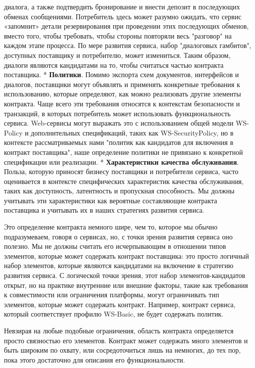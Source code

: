 \documentclass[11pt]{article}
\begin{document}
диалога, а также подтвердить бронирование и внести депозит в последующих
обменах сообщениями. Потребитель здесь может разумно ожидать, что сервис
«запомнит» детали резервирования при проведении этих последующих
обменов, вместо того, чтобы требовать, чтобы стороны повторяли весь
"разговор" на каждом этапе процесса. По мере развития сервиса, набор
"диалоговых гамбитов", доступных поставщику и потребителю, может
измениться. Таким образом, диалоги являются кандидатами на то, чтобы
считаться частью контракта поставщика. * \textbf{Политики}. Помимо
экспорта схем документов, интерфейсов и диалогов, поставщики могут
объявлять и применять конкретные требования к использованию, которые
определяют, как можно реализовать другие элементы контракта. Чаще всего
эти требования относятся к контекстам безопасности и транзакций, в
которых потребитель может использовать функциональность сервиса.
Web-сервисы могут выражать это с использованием общей модели WS-Policy и
дополнительных спецификаций, таких как WS-SecurityPolicy, но в контексте
рассматриваемых нами "политик как кандидатов для включения в контракт
поставщика", наше определение политики не привязано к конкретной
спецификации или реализации. * \textbf{Характеристики качества
обслуживания}. Польза, которую приносят бизнесу поставщики и потребители
сервиса, часто оценивается в контексте специфических характеристик
качества обслуживания, таких как доступность, латентность и пропускная
способность. Мы должны учитывать эти характеристики как вероятные
составляющие контракта поставщика и учитывать их в наших стратегиях
развития сервиса.

Это определение контракта немного шире, чем то, которое мы обычно
подразумеваем, говоря о сервисах, но, с точки зрения развития сервиса
оно полезно. Мы не должны считать его исчерпывающим в отношении типов
элементов, которые может содержать контракт поставщика: это просто
логичный набор элементов, которые являются кандидатами на включение в
стратегию развития сервиса. С логической точки зрения, этот набор
элементов-кандидатов открыт, но на практике внутренние или внешние
факторы, такие как требования к совместимости или ограничения платформы,
могут ограничивать тип элементов, которые может содержать контракт.
Например, контракт сервиса, который соответствует профилю WS-Basic, не
будет содержать политик.

Невзирая на любые подобные ограничения, область контракта определяется
просто связностью его элементов. Контракт может содержать много
элементов и быть широким по охвату, или сосредоточиться лишь на
немногих, до тех пор, пока этого достаточно для описания его
функциональности.
\end{document}
